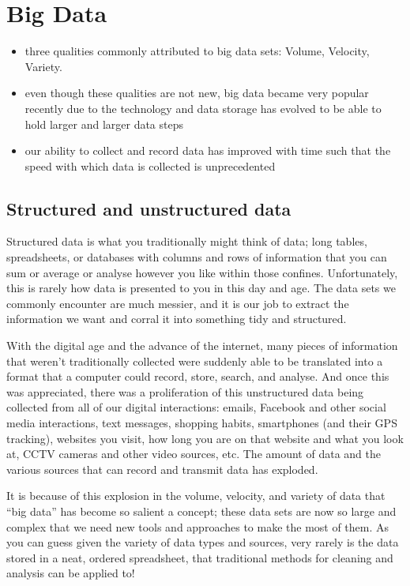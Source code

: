 \documentclass[11pt,fancy]{elegantbook}
\begin{document}
\section{Big Data}
\begin{itemize}
    \item three qualities commonly attributed to big data sets: Volume, Velocity, Variety.
    \item even though these qualities are not new, big data became very popular recently due to the technology and data storage has evolved to be able to hold larger and larger data steps
    \item our ability to collect and record data has improved with time such that the speed with which data is collected is unprecedented
\end{itemize}

\subsection{Structured and unstructured data}
Structured data is what you traditionally might think of data; long tables, spreadsheets, or databases with columns and rows of information that you can sum or average or analyse however you like within those confines. Unfortunately, this is rarely how data is presented to you in this day and age. The data sets we commonly encounter are much messier, and it is our job to extract the information we want and corral it into something tidy and structured.
\par With the digital age and the advance of the internet, many pieces of information that weren't traditionally collected were suddenly able to be translated into a format that a computer could record, store, search, and analyse. And once this was appreciated, there was a proliferation of this unstructured data being collected from all of our digital interactions: emails, Facebook and other social media interactions, text messages, shopping habits, smartphones (and their GPS tracking), websites you visit, how long you are on that website and what you look at, CCTV cameras and other video sources, etc. The amount of data and the various sources that can record and transmit data has exploded.
\par It is because of this explosion in the volume, velocity, and variety of data that “big data” has become so salient a concept; these data sets are now so large and complex that we need new tools and approaches to make the most of them. As you can guess given the variety of data types and sources, very rarely is the data stored in a neat, ordered spreadsheet, that traditional methods for cleaning and analysis can be applied to!
\end{document}
